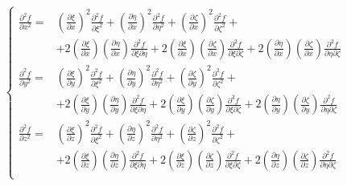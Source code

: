 \documentclass
[
a4paper,                      %
twoside,					  %
12pt,                         %
abstract,		      %
fleqn,                        %
]
{scrartcl} %
\begin{document}
\begin{equation}
\begin{cases}
\frac{\partial^{2} f}{\partial x^{2}}=&\left(\frac{\partial\xi}{\partial x}\right)^{2}\frac{\partial^{2} f}{\partial\xi^{2}}+\left(\frac{\partial\eta}{\partial x}\right)^{2}\frac{\partial^{2} f}{\partial\eta^{2}}+\left(\frac{\partial\zeta}{\partial x}\right)^{2}\frac{\partial^{2} f}{\partial\zeta^{2}}+\\[5pt]&+2\left(\frac{\partial\xi}{\partial x}\right)\left(\frac{\partial\eta}{\partial x}\right)\frac{\partial^{2} f}{\partial\xi\partial\eta}+2\left(\frac{\partial\xi}{\partial x}\right)\left(\frac{\partial\zeta}{\partial x}\right)\frac{\partial^{2} f}{\partial\xi\partial\zeta}+2\left(\frac{\partial\eta}{\partial x}\right)\left(\frac{\partial\zeta}{\partial x}\right)\frac{\partial^{2} f}{\partial\eta\partial\zeta}\\[10pt]
\frac{\partial^{2} f}{\partial y^{2}}=&\left(\frac{\partial\xi}{\partial y}\right)^{2}\frac{\partial^{2} f}{\partial\xi^{2}}+\left(\frac{\partial\eta}{\partial y}\right)^{2}\frac{\partial^{2} f}{\partial\eta^{2}}+\left(\frac{\partial\zeta}{\partial y}\right)^{2}\frac{\partial^{2} f}{\partial\zeta^{2}}+\\[5pt]&+2\left(\frac{\partial\xi}{\partial y}\right)\left(\frac{\partial\eta}{\partial y}\right)\frac{\partial^{2} f}{\partial\xi\partial\eta}+2\left(\frac{\partial\xi}{\partial y}\right)\left(\frac{\partial\zeta}{\partial y}\right)\frac{\partial^{2} f}{\partial\xi\partial\zeta}+2\left(\frac{\partial\eta}{\partial y}\right)\left(\frac{\partial\zeta}{\partial y}\right)\frac{\partial^{2} f}{\partial\eta\partial\zeta}\\[10pt]
\frac{\partial^{2} f}{\partial z^{2}}=&\left(\frac{\partial\xi}{\partial z}\right)^{2}\frac{\partial^{2} f}{\partial\xi^{2}}+\left(\frac{\partial\eta}{\partial z}\right)^{2}\frac{\partial^{2} f}{\partial\eta^{2}}+\left(\frac{\partial\zeta}{\partial z}\right)^{2}\frac{\partial^{2} f}{\partial\zeta^{2}}+\\[5pt]&+2\left(\frac{\partial\xi}{\partial z}\right)\left(\frac{\partial\eta}{\partial z}\right)\frac{\partial^{2} f}{\partial\xi\partial\eta}+2\left(\frac{\partial\xi}{\partial z}\right)\left(\frac{\partial\zeta}{\partial z}\right)\frac{\partial^{2} f}{\partial\xi\partial\zeta}+2\left(\frac{\partial\eta}{\partial z}\right)\left(\frac{\partial\zeta}{\partial z}\right)\frac{\partial^{2} f}{\partial\eta\partial\zeta}\\[10pt]
\end{cases}
\end{equation}
\end{document}
